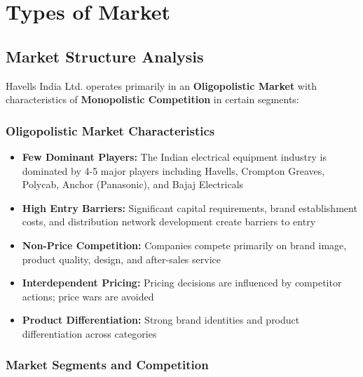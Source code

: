 \documentclass[12pt,a4paper]{article}
\begin{document}
\section{Types of Market}

\subsection{Market Structure Analysis}

Havells India Ltd. operates primarily in an \textbf{Oligopolistic Market} with characteristics of \textbf{Monopolistic Competition} in certain segments:

\subsubsection{Oligopolistic Market Characteristics}

\begin{itemize}[leftmargin=*]
    \item \textbf{Few Dominant Players:} The Indian electrical equipment industry is dominated by 4-5 major players including Havells, Crompton Greaves, Polycab, Anchor (Panasonic), and Bajaj Electricals
    \item \textbf{High Entry Barriers:} Significant capital requirements, brand establishment costs, and distribution network development create barriers to entry
    \item \textbf{Non-Price Competition:} Companies compete primarily on brand image, product quality, design, and after-sales service
    \item \textbf{Interdependent Pricing:} Pricing decisions are influenced by competitor actions; price wars are avoided
    \item \textbf{Product Differentiation:} Strong brand identities and product differentiation across categories
\end{itemize}

\subsubsection{Market Segments and Competition}
\end{document}
